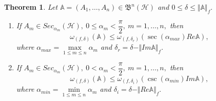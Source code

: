 \documentclass[10pt,a4paper]{amsart}
\newtheorem{theorem}{Theorem}
\begin{document}
\begin{theorem}
\label{thm9}
Let $\mathbb{A} = (A_{1}, \ldots, A_{n}) \in \mathfrak{B}^{n}(\mathcal{H})$ and $ 0\leq\delta\leq \Vert \mathbb{A} \Vert_{f}. $
\begin{enumerate}[label=\upshape{\arabic*.}, ref=\upshape{\arabic*}, labelindent=5pt, leftmargin=*,ref=\upshape{\arabic*.}]
\item \label{item1-thm9} If $ A_{m}\in Sec_{\alpha_{m}}(\mathcal{H}), \ 0\leq \alpha_{m}<\dfrac{\pi}{2}, \ m=1,\ldots ,n, $ then
\[
\omega_{(f,\delta)}(\mathbb{A})\leq \omega_{(f,\delta_{r})}(\sec(\alpha_{max})Re\mathbb{A}),
\]
where $ \alpha_{max}=\max\limits_{1\leq m \leq n}\alpha_{m} $ and $ \delta_{r}=\delta - \Vert Im \mathbb{A} \Vert_{f} .$
\item \label{item2-thm9} If $ A_{m}\in Sec_{\alpha_{m}}(\mathcal{H}), \ 0< \alpha_{m}<\dfrac{\pi}{2}, \ m=1,\ldots ,n, $ then
\[
\omega_{(f,\delta)}(\mathbb{A})\leq \omega_{(f,\delta_{i})}(\csc(\alpha_{min})Im\mathbb{A}),
\]
where $ \alpha_{min}=\min\limits_{1\leq m \leq n}\alpha_{m} $ and $ \delta_{i}=\delta - \Vert Re \mathbb{A} \Vert_{f} .$
\end{enumerate}
\end{theorem}
\end{document}
